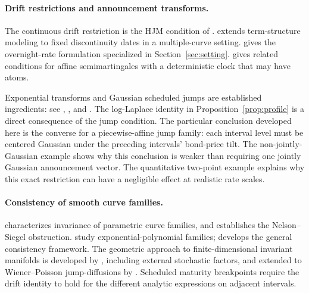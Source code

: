 \paragraph{Drift restrictions and announcement transforms.}
The continuous drift restriction is the HJM condition of \citet{heath1992bond}. \citet{fontana2018term} extends term-structure modeling to fixed discontinuity dates in a multiple-curve setting. \citet[Theorem 3.5, Remark 3.9]{fontana2022term} gives the overnight-rate formulation specialized in Section~\ref{sec:setting}. \citet{kellerressel2018affine} gives related conditions for affine semimartingales with a deterministic clock that may have atoms.

Exponential transforms and Gaussian scheduled jumps are established ingredients: see \citet{kellerressel2018affine}, \citet[Example 3.10 and Section 4.3]{fontana2022term}, and \citet[Proposition 1]{kim2014jumps}. The log-Laplace identity in Proposition~\ref{prop:profile} is a direct consequence of the jump condition. The particular conclusion developed here is the converse for a piecewise-affine jump family: each interval level must be centered Gaussian under the preceding intervals' bond-price tilt. The non-jointly-Gaussian example shows why this conclusion is weaker than requiring one jointly Gaussian announcement vector. The quantitative two-point example explains why this exact restriction can have a negligible effect at realistic rate scales.

\paragraph{Consistency of smooth curve families.}
\citet{bjork1999interest} characterizes invariance of parametric curve families, and \citet{filipovic1999note} establishes the Nelson--Siegel obstruction. \citet{filipovic2000exponential,sharef2004conditions} study exponential-polynomial families; \citet{filipovic2001consistency} develops the general consistency framework. The geometric approach to finite-dimensional invariant manifolds is developed by \citet{filipovic2004geometry}, including external stochastic factors, and extended to Wiener--Poisson jump-diffusions by \citet{filipovic2012invariant}. Scheduled maturity breakpoints require the drift identity to hold for the different analytic expressions on adjacent intervals.


